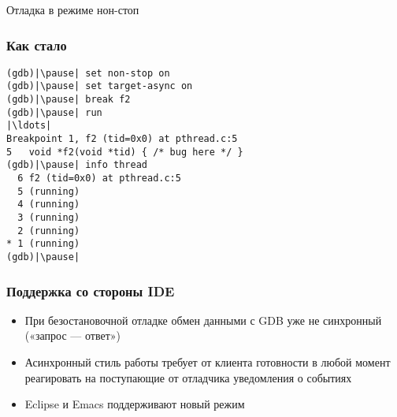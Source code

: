 \documentclass[onlymath]{beamer}
\begin{document}
\begin{subsection}{Отладка в режиме нон-стоп}
\begin{frame}[fragile]
  \frametitle{Как стало}
\begin{lstlisting}[style=gdbsession]
(gdb)|\pause| set non-stop on
(gdb)|\pause| set target-async on
(gdb)|\pause| break f2
(gdb)|\pause| run
|\ldots|
Breakpoint 1, f2 (tid=0x0) at pthread.c:5
5	void *f2(void *tid) { /* bug here */ }
(gdb)|\pause| info thread
  6 f2 (tid=0x0) at pthread.c:5
  5 (running)
  4 (running)
  3 (running)
  2 (running)
* 1 (running)
(gdb)|\pause|
\end{lstlisting}
\end{frame}

\begin{frame}
  \frametitle{Поддержка со стороны IDE}
  \begin{itemize}
  \item При безостановочной отладке обмен данными с GDB уже не
    синхронный («запрос — ответ»)
  \item Асинхронный стиль работы требует от клиента готовности в любой
    момент реагировать на поступающие от отладчика уведомления о
    событиях
  \item Eclipse и Emacs поддерживают новый режим
  \end{itemize}
\end{frame}
\end{subsection}
\end{document}
